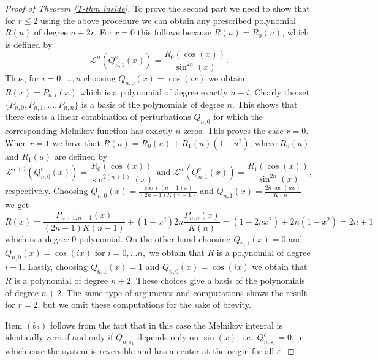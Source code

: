 \documentclass[12pt,psamsfonts]{amsart}
\begin{document}
\begin{proof}[Proof of  Theorem \ref{T-thm inside}]
To prove the second part we need to show that for $r\le 2$ using the above procedure we can obtain
any prescribed polynomial $R(u)$ of degree $n+2r.$ For $r=0$ this follows because $ R(u)=
R_{0}(u)$, which is defined by
$${\mathscr{L}}^n \left(Q^e_{n,1}(x)\right)=\frac
{R_{0}(\cos(x))}{\sin^{2n}(x)}.$$ Thus, for $i=0,\ldots,n$ choosing $Q_{n,0}(x)=\cos(ix)$ we
obtain $R(x)=P_{n,i}(x)$ which is a polynomial of degree exactly $n-i.$ Clearly the set
$\{P_{n,0},P_{n,1},\ldots,P_{n,n}\}$ is a basis of the polynomials of degree $n.$ This shows that
there exists a linear combination of perturbations $Q_{n,0}$ for which the corresponding Melnikov
function has exactly $n$ zeros. This proves the case $r=0.$ When $r=1$ we have that $R(u)=
R_{0}(u)+R_1(u)(1-u^2)$, where $R_0(u)$ and $R_1(u)$  are defined by
\begin{equation*}
    {\mathscr{L}}^{n+1}\left(Q^e_{n,0}(x)\right)=\frac{R_{0}(\cos(x))}{\sin^{2(n+1)}(x)} \mbox { and }
    {\mathscr{L}}^{n}\left(Q^e_{n,1}(x)\right)=\frac{R_{1}(\cos(x))}{\sin^{2n}(x)},
\end{equation*}
respectively. Choosing
$Q_{n,0}(x)=\frac{\cos((n-1)x)}{(2n-1)K(n-1)} $ and
$Q_{n,1}(x)=\frac{2n\cos(n x)}{K(n)} $ we get
$$R(x)=\frac{P_{n+1,n-1}(x)}{(2n-1)K(n-1)}+(1-x^2)2n\frac{P_{n,n}(x)}{K(n)}=(1+2nx^2)
+2n(1-x^2)=2n+1$$ which is a degree 0 polynomial. On the other hand choosing
$Q_{n,1}(x)=0$ and $Q_{n,0}(x)=\cos (ix)$ for $i=0,\ldots n,$ we obtain that $R$ is a polynomial of degree $i+1.$
Lastly, choosing $Q_{n,1}(x)=1$ and  $Q_{n,0}(x)=\cos (ix)$ we obtain that $R$ is a polynomial of
degree $n+2$. These choices give a basis of the polynomials of degree $n+2.$ The same type of
arguments and computations shows the result for $r=2$, but we omit these computations for the sake
of brevity.

Item  $(b_2)$ follows from the fact that in this case the Melnikov integral is
identically zero if and only if $Q_{n,s_1}$ depends only on $\sin (x)$, i.e.~$Q_{n,s_1}^e= 0$, in
which case the system is reversible and has a center at the origin for all ${\varepsilon}.$
\end{proof}
\end{document}
